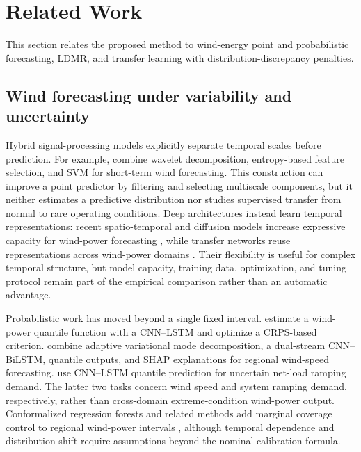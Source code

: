 \documentclass[a4paper]{cas-sc}
\begin{document}

\section{Related Work}\label{rel}
{\color{blue}This section relates the proposed method to wind-energy point and probabilistic forecasting, LDMR, and transfer learning with distribution-discrepancy penalties.}

\subsection{Wind forecasting under variability and uncertainty}
{\color{blue}Hybrid signal-processing models explicitly separate temporal scales before prediction. For example, \citet{abedinia2022multilevel} combine wavelet decomposition, entropy-based feature selection, and SVM for short-term wind forecasting. This construction can improve a point predictor by filtering and selecting multiscale components, but it neither estimates a predictive distribution nor studies supervised transfer from normal to rare operating conditions. Deep architectures instead learn temporal representations: recent spatio-temporal and diffusion models increase expressive capacity for wind-power forecasting \citep{liu2025diffusion,zhang2026gwsstnet}, while transfer networks reuse representations across wind-power domains \citep{yin2021serioparallel,dong2023mdan}. Their flexibility is useful for complex temporal structure, but model capacity, training data, optimization, and tuning protocol remain part of the empirical comparison rather than an automatic advantage.}

{\color{blue}Probabilistic work has moved beyond a single fixed interval. \citet{abedinia2024quantile} estimate a wind-power quantile function with a CNN--LSTM and optimize a CRPS-based criterion. \citet{serttas2026multiscale} combine adaptive variational mode decomposition, a dual-stream CNN--BiLSTM, quantile outputs, and SHAP explanations for regional wind-speed forecasting. \citet{yu2025ramping} use CNN--LSTM quantile prediction for uncertain net-load ramping demand. The latter two tasks concern wind speed and system ramping demand, respectively, rather than cross-domain extreme-condition wind-power output. Conformalized regression forests and related methods add marginal coverage control to regional wind-power intervals \citep{jonkers2024regional,romano2019cqr}, although temporal dependence and distribution shift require assumptions beyond the nominal calibration formula.}
\end{document}
